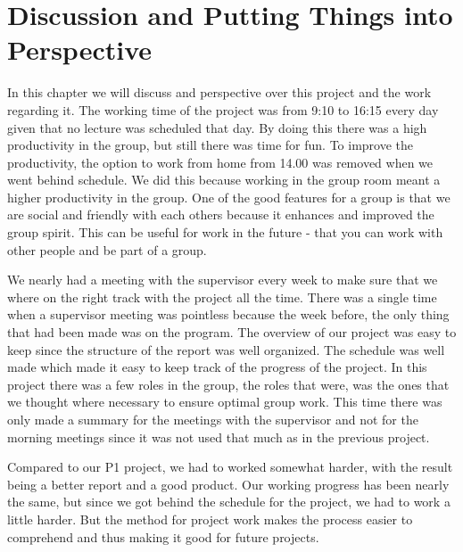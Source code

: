 \chapter{Discussion and Putting Things into Perspective}
In this chapter we will discuss and perspective over this project and the work regarding it.
The working time of the project was from 9:10 to 16:15 every day given that no lecture was scheduled that day. By doing this there was a high productivity in the group, but still there was time for fun. To improve the productivity, the option to work from home from 14.00 was removed when we went behind schedule.
We did this because working in the group room meant a higher productivity in the group. One of the good features for a group is that we are social and friendly with each others because it enhances and improved the group spirit. This can be useful for work in the future - that you can work with other people and be part of a group.

We nearly had a meeting with the supervisor every week to make sure that we where on the right track with the project all the time. There was a single time when a supervisor meeting was pointless because the week before, the only thing that had been made was on the program. The overview of our project was easy to keep since the structure of the report was well organized. The schedule was well made which made it easy to keep track of the progress of the project. In this project there was a few roles in the group, the roles that were, was the ones that we thought where necessary to ensure optimal group work. This time there was only made a summary for the meetings with the supervisor and not for the morning meetings since it was not used that much as in the previous project. 

Compared to our P1 project, we had to worked somewhat harder, with the result being a better report and a good product. Our working progress has been nearly the same, but since we got behind the schedule for the project, we had to work a little harder. But the method for project work makes the process easier to comprehend and thus making it good for future projects.